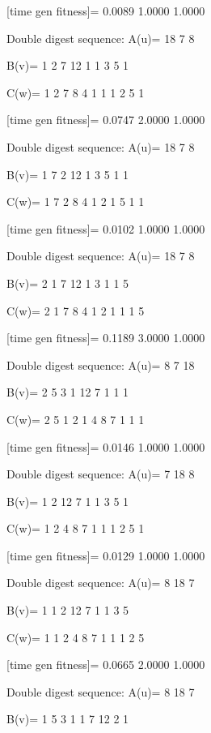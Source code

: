 [time gen fitness]=
    0.0089    1.0000    1.0000

Double digest sequence:
A(u)=
    18     7     8

B(v)=
     1     2     7    12     1     1     3     5     1

C(w)=
     1     2     7     8     4     1     1     1     2     5     1

[time gen fitness]=
    0.0747    2.0000    1.0000

Double digest sequence:
A(u)=
    18     7     8

B(v)=
     1     7     2    12     1     3     5     1     1

C(w)=
     1     7     2     8     4     1     2     1     5     1     1

[time gen fitness]=
    0.0102    1.0000    1.0000

Double digest sequence:
A(u)=
    18     7     8

B(v)=
     2     1     7    12     1     3     1     1     5

C(w)=
     2     1     7     8     4     1     2     1     1     1     5

[time gen fitness]=
    0.1189    3.0000    1.0000

Double digest sequence:
A(u)=
     8     7    18

B(v)=
     2     5     3     1    12     7     1     1     1

C(w)=
     2     5     1     2     1     4     8     7     1     1     1

[time gen fitness]=
    0.0146    1.0000    1.0000

Double digest sequence:
A(u)=
     7    18     8

B(v)=
     1     2    12     7     1     1     3     5     1

C(w)=
     1     2     4     8     7     1     1     1     2     5     1

[time gen fitness]=
    0.0129    1.0000    1.0000

Double digest sequence:
A(u)=
     8    18     7

B(v)=
     1     1     2    12     7     1     1     3     5

C(w)=
     1     1     2     4     8     7     1     1     1     2     5

[time gen fitness]=
    0.0665    2.0000    1.0000

Double digest sequence:
A(u)=
     8    18     7

B(v)=
     1     5     3     1     1     7    12     2     1

